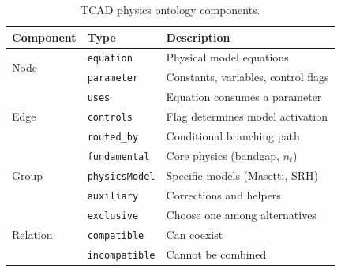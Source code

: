 \begin{table}[!h]
\caption{TCAD physics ontology components.}
\label{tab:ontology_mapping}
\centering
\renewcommand{\arraystretch}{1.15}
\footnotesize
\begin{tabular}{@{}lll@{}}
\toprule
\textbf{Component} & \textbf{Type} & \textbf{Description} \\
\midrule
\multirow{2}{*}{Node} & \texttt{equation} & Physical model equations \\
 & \texttt{parameter} & Constants, variables, control flags \\
\midrule
\multirow{3}{*}{Edge} & \texttt{uses} & Equation consumes a parameter \\
 & \texttt{controls} & Flag determines model activation \\
 & \texttt{routed\_by} & Conditional branching path \\
\midrule
\multirow{3}{*}{Group} & \texttt{fundamental} & Core physics (bandgap, $n_i$) \\
 & \texttt{physicsModel} & Specific models (Masetti, SRH) \\
 & \texttt{auxiliary} & Corrections and helpers \\
\midrule
\multirow{3}{*}{Relation} & \texttt{exclusive} & Choose one among alternatives \\
 & \texttt{compatible} & Can coexist \\
 & \texttt{incompatible} & Cannot be combined \\
\bottomrule
\end{tabular}
\end{table}
